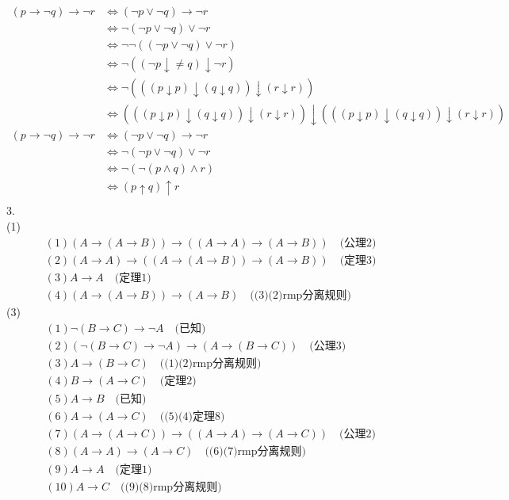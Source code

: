 \documentclass{article}
\begin{document}
\[
\begin{aligned}
(p \to \neg q) \to \neg r & \iff (\neg p \vee \neg q) \to \neg r \\
                          & \iff \neg (\neg p \vee \neg q) \vee \neg r \\
                          & \iff \neg \neg ((\neg p \vee \neg q) \vee \neg r) \\
                          & \iff \neg ((\neg p \downarrow \neq q) \downarrow \neg r) \\
                          & \iff \neg (((p \downarrow p) \downarrow (q \downarrow q)) \downarrow (r \downarrow r)) \\
                          & \iff (((p \downarrow p) \downarrow (q \downarrow q)) \downarrow (r \downarrow r)) \downarrow (((p \downarrow p) \downarrow (q \downarrow q)) \downarrow (r \downarrow r)) \\
(p \to \neg q) \to \neg r & \iff (\neg p \vee \neg q) \to \neg r \\
                          & \iff \neg (\neg p \vee \neg q) \vee \neg r \\
                          & \iff \neg (\neg(p \wedge q) \wedge r) \\
                          & \iff (p \uparrow q) \uparrow r
\\\end{aligned}    
\]
3.\\
(1)\\
\[
\begin{aligned}
&(1)(A \to (A \to B)) \to ((A \to A) \to (A \to B))\quad \mbox{(公理2)}\\
&(2)(A \to A) \to ((A \to (A \to B)) \to (A \to B))\quad \mbox{(定理3)}\\
&(3)A \to A \quad \mbox{(定理1)}\\
&(4)(A \to (A \to B)) \to (A \to B) \quad \mbox{((3)(2)rmp分离规则)}
\end{aligned}
\]
(3)
\[
\begin{aligned}
&(1)\neg (B \to C) \to \neg A \quad \mbox{(已知)}\\
&(2)(\neg (B \to C) \to \neg A) \to (A \to (B \to C)) \quad \mbox{(公理3)} \\
&(3)A \to (B \to C) \quad \mbox{((1)(2)rmp分离规则)}\\
&(4)B \to (A \to C) \quad \mbox{(定理2)}\\
&(5)A \to B \quad \mbox{(已知)} \\
&(6)A \to (A \to C) \quad \mbox{((5)(4)定理8)} \\
&(7)(A \to (A \to C)) \to ((A \to A) \to (A \to C)) \quad \mbox{(公理2)} \\
&(8)(A \to A) \to (A \to C) \quad \mbox{((6)(7)rmp分离规则)} \\
&(9)A \to A \quad \mbox{(定理1)} \\
&(10)A \to C \quad \mbox{((9)(8)rmp分离规则)}
\end{aligned}
\]
\end{document}
